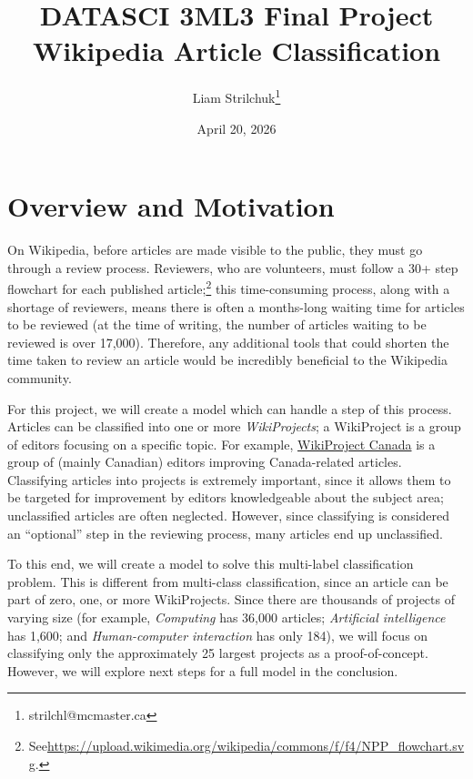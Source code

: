 \documentclass{article}
\begin{document}
\title{DATASCI 3ML3 Final Project\\{\Large{Wikipedia Article Classification}}}
\author{Liam Strilchuk\thanks{strilchl@mcmaster.ca}}
\date{April 20, 2026}
\maketitle

\tableofcontents
\cleardoublepage

\section{Overview and Motivation}

On Wikipedia, before articles are made visible to the public, they must go through a
review process. Reviewers, who are volunteers, must follow a 30+ step flowchart for each
published article;\footnote{See\url{https://upload.wikimedia.org/wikipedia/commons/f/f4/NPP_flowchart.svg}.}
this time-consuming process, along with a shortage of reviewers, means
there is often a months-long waiting time for articles to be reviewed (at the time of
writing, the number of articles waiting to be reviewed is over 17,000). Therefore, any
additional tools that could shorten the time taken to review an article would be incredibly
beneficial to the Wikipedia community.

For this project, we will create a model which can handle a step of this process. Articles
can be classified into one or more \textit{WikiProjects}; a WikiProject is a group of editors
focusing on a specific topic. For example, \href{https://en.wikipedia.org/wiki/Wikipedia:WikiProject_Canada}
{WikiProject Canada} is a group of (mainly Canadian) editors improving Canada-related articles.
Classifying articles into projects is extremely important, since it allows them to be targeted
for improvement by editors knowledgeable about the subject area; unclassified articles are
often neglected. However, since classifying is considered an ``optional'' step in the
reviewing process, many articles end up unclassified.

To this end, we will create a model to solve this multi-label classification problem. This
is different from multi-class classification, since an article can be part of zero, one, or
more WikiProjects. Since there are thousands of projects of varying size (for example,
\textit{Computing} has 36,000 articles; \textit{Artificial intelligence} has 1,600; and
\textit{Human-computer interaction} has only 184), we will focus on classifying only the
approximately 25 largest projects as a proof-of-concept. However, we will explore next
steps for a full model in the conclusion.
\end{document}
